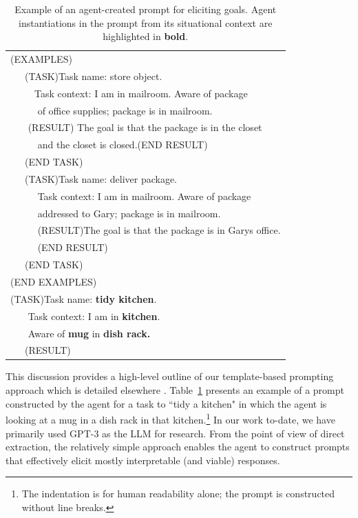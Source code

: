 \documentclass[letterpaper]{article} %
\begin{document}
\begin{table}[t]
    \centering
    \begin{tabular}{l}
    \hline
    (EXAMPLES)\\
    ~~~(TASK)Task name: store object. \\ ~~~~~Task context: I am in mailroom.
Aware of package  \\ ~~~~~ of office supplies; package is in mailroom.\\
~~~ (RESULT) The goal is that the package is in the closet \\
~~~~~ and the closet is closed.(END RESULT) \\
~~~(END TASK) \\
~~~(TASK)Task name: deliver package. \\ ~~~~~ Task context: I am in mailroom.
Aware of package \\ ~~~~~ addressed to Gary; package is in mailroom. \\
~~~~~ (RESULT)The goal is that the package is in Garys office. \\~~~~~ (END RESULT)
\\ ~~~(END TASK) \\
(END EXAMPLES) \\
(TASK)Task name: \textbf{tidy kitchen}. \\ ~~~ Task context: I am in \textbf{kitchen}. \\
~~~ Aware of \textbf{mug} in \textbf{dish rack.}\\ ~~~(RESULT) \\
\hline


    \end{tabular}
    \caption{Example of an agent-created prompt for eliciting goals. Agent instantiations in the prompt from its situational context are highlighted in \textbf{bold}.}
    \label{tab:prompt_example}
\end{table}


This discussion provides a high-level outline of our template-based prompting approach which is detailed elsewhere \cite{kirk_improving_2022}. Table~\ref{tab:prompt_example} presents an example of a prompt constructed by the agent for a task to ``tidy a kitchen" in which the agent is looking at a mug in a dish rack in that kitchen.\footnote{The indentation is for human readability alone; the prompt is constructed without line breaks.} In our work to-date, we have primarily used GPT-3 \cite{brown_language_2020} as the LLM for research. From the point of view of direct extraction, the relatively simple approach enables the agent to construct prompts that effectively elicit mostly interpretable (and viable) responses.
\end{document}

